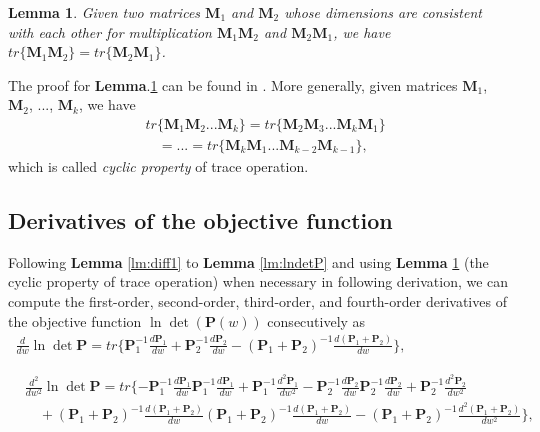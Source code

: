 \documentclass[12pt]{article}
\newtheorem{lemma}{Lemma}
\begin{document}
\begin{lemma} \label{lm:trcyclic}
Given two matrices $\mathbf{M}_1$ and $\mathbf{M}_2$ whose dimensions are consistent with each other for multiplication $\mathbf{M}_1 \mathbf{M}_2$ and $\mathbf{M}_2 \mathbf{M}_1$, we have $tr\{\mathbf{M}_1 \mathbf{M}_2\} = tr\{\mathbf{M}_2 \mathbf{M}_1\}$.
\end{lemma}
The proof for \textbf{Lemma}.\ref{lm:trcyclic} can be found in \cite{Horn1990}. More generally, given matrices $\mathbf{M}_1$, $\mathbf{M}_2$, ..., $\mathbf{M}_k$, we have 
\begin{align*}
&tr\{\mathbf{M}_1 \mathbf{M}_2 ... \mathbf{M}_k\} = tr\{\mathbf{M}_2 \mathbf{M}_3 ... \mathbf{M}_k \mathbf{M}_1\} \\
&~~~~= ... = tr\{\mathbf{M}_k \mathbf{M}_1 ... \mathbf{M}_{k-2} \mathbf{M}_{k-1}\},
\end{align*}
which is called \textit{cyclic property} of trace operation.

\subsection{Derivatives of the objective function}

Following \textbf{Lemma} \ref{lm:diff1} to \textbf{Lemma} \ref{lm:lndetP} and using \textbf{Lemma} \ref{lm:trcyclic} (the cyclic property of trace operation) when necessary in following derivation, we can compute the first-order, second-order, third-order, and fourth-order derivatives of the objective function $\ln \det(\mathbf{P}(w))$ consecutively as
\begin{align}  \label{eq:lndetP_1stDif}
\frac{d}{d w} \ln \det \mathbf{P} = tr\{ \mathbf{P}_1^{-1} \frac{d \mathbf{P}_1}{dw} + \mathbf{P}_2^{-1} \frac{d \mathbf{P}_2}{dw} - (\mathbf{P}_1+\mathbf{P}_2)^{-1} \frac{d (\mathbf{P}_1+\mathbf{P}_2)}{dw} \},  \qquad \qquad \qquad \quad
\end{align}

\begin{align} \label{eq:lndetP_2ndDif}
& \frac{d^2}{dw^2} \ln \det \mathbf{P} = tr\{-\mathbf{P}_1^{-1} \frac{d \mathbf{P}_1}{dw} \mathbf{P}_1^{-1} \frac{d \mathbf{P}_1}{dw} + \mathbf{P}_1^{-1} \frac{d^2 \mathbf{P}_1}{dw^2} -\mathbf{P}_2^{-1} \frac{d \mathbf{P}_2}{dw} \mathbf{P}_2^{-1} \frac{d \mathbf{P}_2}{dw} + \mathbf{P}_2^{-1} \frac{d^2 \mathbf{P}_2}{dw^2}  \nonumber \\
&\quad +(\mathbf{P}_1+\mathbf{P}_2)^{-1} \frac{d (\mathbf{P}_1+\mathbf{P}_2)}{dw} (\mathbf{P}_1+\mathbf{P}_2)^{-1} \frac{d (\mathbf{P}_1+\mathbf{P}_2)}{dw} - (\mathbf{P}_1+\mathbf{P}_2)^{-1} \frac{d^2 (\mathbf{P}_1+\mathbf{P}_2)}{dw^2} \},
\end{align}
\end{document}
